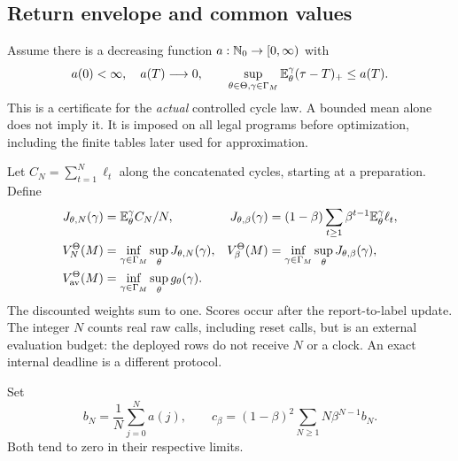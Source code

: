 \subsection{Return envelope and common values}
Assume there is a decreasing function $a:\mathbb N_0\to[0,\infty)$ with
\begin{equation}\label{eq:UI}
 a(0)<\infty,\quad a(T)\longrightarrow0,\qquad
 \sup_{\theta\in\Theta,\gamma\in\Gamma_M}\mathbb E_\theta^\gamma(\tau-T)_+\le a(T).
\end{equation}
This is a certificate for the \emph{actual} controlled cycle law. A bounded mean alone does not imply it. It is imposed on all legal programs before optimization, including the finite tables later used for approximation.

Let $C_N=\sum_{t=1}^N\ell_t$ along the concatenated cycles, starting at a preparation. Define
\begin{align}\label{eq:values}
 J_{\theta,N}(\gamma)&=\mathbb E_\theta^\gamma C_N/N,&
 J_{\theta,\beta}(\gamma)&=(1-\beta)\sum_{t\ge1}\beta^{t-1}\mathbb E_\theta^\gamma\ell_t,\\
 V_N^\Theta(M)&=\inf_{\gamma\in\Gamma_M}\sup_\theta J_{\theta,N}(\gamma),&
 V_\beta^\Theta(M)&=\inf_{\gamma\in\Gamma_M}\sup_\theta J_{\theta,\beta}(\gamma),\notag\\
 V_{\mathrm{av}}^\Theta(M)&=\inf_{\gamma\in\Gamma_M}\sup_\theta g_\theta(\gamma).&&\notag
\end{align}
The discounted weights sum to one. Scores occur after the report-to-label update. The integer $N$ counts real raw calls, including reset calls, but is an external evaluation budget: the deployed rows do not receive $N$ or a clock. An exact internal deadline is a different protocol.

Set
\begin{equation}\label{eq:moduli}
 b_N=\frac1N\sum_{j=0}^N a(j),\qquad
 c_\beta=(1-\beta)^2\sum_{N\ge1}N\beta^{N-1}b_N.
\end{equation}
Both tend to zero in their respective limits.

